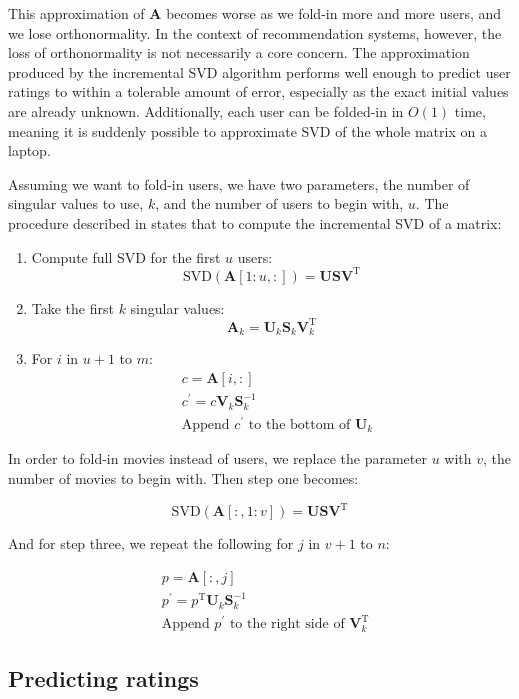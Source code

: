 \documentclass{article} %
\newcommand{\A}{\mathbf{A}}
\newcommand{\T}{\textrm{T}}
\begin{document}
This approximation of $\A$ becomes worse as we fold-in more and more users, and we lose orthonormality.
In the context of recommendation systems, however, the loss of orthonormality is not necessarily a core concern.
The approximation produced by the incremental SVD algorithm performs well enough to predict user ratings to within a tolerable amount of error, especially as the exact initial values are already unknown.
Additionally, each user can be folded-in in $O(1)$ time, meaning it is suddenly possible to approximate SVD of the whole matrix on a laptop.

Assuming we want to fold-in users, we have two parameters, the number of singular values to use, $k$, and the number of users to begin with, $u$.
The procedure described in \cite{slides} states that to compute the incremental SVD of a matrix:

\begin{enumerate}
\item Compute full SVD for the first $u$ users:
$$\textrm{SVD}(\A[1:u,:]) = \mathbf{U}\mathbf{S}\mathbf{V}^{\T}$$
\item Take the first $k$ singular values:
$$\A_k= \mathbf{U}_k\mathbf{S}_k\mathbf{V}_k^{\T}$$
\item For $i$ in $u+1$ to $m$:
\begin{align*}
&c = \A[i,:]\\
&c^{\prime} = c \mathbf{V}_k \mathbf{S}_k^{-1}\\
&\textrm{Append $c^{\prime}$ to the bottom of $\mathbf{U}_k$}
\end{align*}
\end{enumerate}

In order to fold-in movies instead of users, we replace the parameter $u$ with $v$, the number of movies to begin with. Then step one becomes:

$$\textrm{SVD}(\A[:,1:v]) = \mathbf{U}\mathbf{S}\mathbf{V}^{\T}$$

And for step three, we repeat the following for $j$ in $v+1$ to $n$:

\begin{align*}
&p = \A[:,j]\\
&p^{\prime} = p^{\T}\mathbf{U}_k\mathbf{S}_k^{-1}\\
&\textrm{Append $p^{\prime}$ to the right side of $\mathbf{V}_k^{\T}$}
\end{align*}

\subsection{Predicting ratings}
\end{document}
